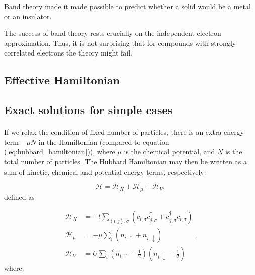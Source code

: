 \documentclass[10pt, twocolumn, twoside]{article}
\begin{document}
Band theory made it made possible to predict whether a solid would be a metal or an insulator.

The success of band theory rests crucially on the independent electron approximation. Thus, it is not surprising that for compounds with strongly correlated electrons the theory might fail. 

\subsection{Effective Hamiltonian}\paragraph{}

\subsection{Exact solutions for simple cases}\label{exactSolutions}\paragraph{}

If we relax the condition of fixed number of particles, there is an extra energy term $-\mu N$ in the Hamiltonian (compared to equation (\ref{eq:hubbard_hamiltonian})), where $\mu$ is the chemical potential, and $N$ is the total number of particles. The Hubbard Hamiltonian may then be written as a sum of kinetic, chemical and potential energy terms, respectively:

\begin{equation}\label{eq:hubbard}
\mathcal{H} = \mathcal{H}_K + \mathcal{H}_\mu + \mathcal{H}_V ,
\end{equation}
defined as

\begin{equation}\label{eq:def_energies}
\begin{split}
\mathcal{H}_K &= -t \sum_{\left\langle i, j \right \rangle, \sigma} ( c_{i,\sigma} c_{j,\sigma}^\dagger + c_{j,\sigma}^\dagger c_{i,\sigma} ) \\
\mathcal{H}_\mu &= -\mu \sum_i ( n_{i,\uparrow} + n_{i,\downarrow} ) \\
\mathcal{H}_V &= U \sum_{i} ( n_{i,\uparrow} - \frac{1}{2} ) ( n_{i,\downarrow} - \frac{1}{2} )
\end{split} ,
\end{equation}
where:
\end{document}
